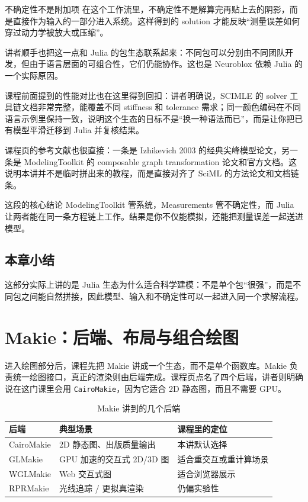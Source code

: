 \documentclass[a4paper]{article}
\begin{document}
\begin{importantbox}{不确定性不是附加项}
在这个工作流里，不确定性不是解算完再贴上去的阴影，而是直接作为输入的一部分进入系统。这样得到的 solution 才能反映“测量误差如何穿过动力学被放大或压缩”。
\end{importantbox}

讲者顺手也把这一点和 Julia 的包生态联系起来：不同包可以分别由不同团队开发，但由于语言层面的可组合性，它们仍能协作。这也是 Neuroblox 依赖 Julia 的一个实际原因。

课程前面提到的性能对比也在这里得到回扣：讲者明确说，SCIMLE 的 solver 工具链文档非常完整，能覆盖不同 stiffness 和 tolerance 需求；同一颜色编码在不同语言示例里保持一致，说明这个生态的目标不是“换一种语法而已”，而是让你把已有模型平滑迁移到 Julia 并复核结果。

课程页的参考文献也很直接：一条是 Izhikevich 2003 的经典尖峰模型论文，另一条是 ModelingToolkit 的 composable graph transformation 论文和官方文档。这说明本讲并不是临时拼出来的教程，而是直接对齐了 SciML 的方法论文和文档链条。

\begin{knowledgebox}{这段的核心结论}
ModelingToolkit 管系统，Measurements 管不确定性，而 Julia 让两者能在同一条方程链上工作。结果是你不仅能模拟，还能把测量误差一起送进模型。
\end{knowledgebox}

\subsection{本章小结}
这部分实际上讲的是 Julia 生态为什么适合科学建模：不是单个包“很强”，而是不同包之间能自然拼接，因此模型、输入和不确定性可以一起进入同一个求解流程。

\section{Makie：后端、布局与组合绘图}
进入绘图部分后，课程先把 Makie 讲成一个生态，而不是单个函数库。Makie 负责统一绘图接口，真正的渲染则由后端完成。课程页点名了四个后端，讲者则明确说在这门课里会用 \texttt{CairoMakie}，因为它适合 2D 静态图，而且不需要 GPU。

\begin{table}[H]
\centering
\caption{Makie 讲到的几个后端}
\begin{tabular}{p{}p{}p{}}
\toprule
后端 & 典型场景 & 课程里的定位 \\
\midrule
CairoMakie & 2D 静态图、出版质量输出 & 本讲默认选择 \\
GLMakie & GPU 加速的交互式 2D/3D 图 & 适合重交互或重计算场景 \\
WGLMakie & Web 交互式图 & 适合浏览器展示 \\
RPRMakie & 光线追踪 / 更拟真渲染 & 仍偏实验性 \\
\bottomrule
\end{tabular}
\end{table}
\end{document}
